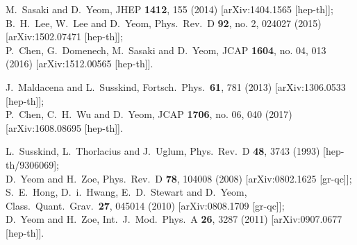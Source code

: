\documentclass[preprintnumbers,10pt,nofootinbib]{revtex4}
\begin{document}
\begin{thebibliography}{200}
  M.~Sasaki and D.~Yeom,
  JHEP {\bf 1412}, 155 (2014)
  [arXiv:1404.1565 [hep-th]];\\
  B.~H.~Lee, W.~Lee and D.~Yeom,
  Phys.\ Rev.\ D {\bf 92}, no. 2, 024027 (2015)
  [arXiv:1502.07471 [hep-th]];\\
  P.~Chen, G.~Domenech, M.~Sasaki and D.~Yeom,
  JCAP {\bf 1604}, no. 04, 013 (2016)
  [arXiv:1512.00565 [hep-th]].

  J.~Maldacena and L.~Susskind,
  Fortsch.\ Phys.\  {\bf 61}, 781 (2013)
  [arXiv:1306.0533 [hep-th]];\\
  P.~Chen, C.~H.~Wu and D.~Yeom,
  JCAP {\bf 1706}, no. 06, 040 (2017)
  [arXiv:1608.08695 [hep-th]].

  L.~Susskind, L.~Thorlacius and J.~Uglum,
  Phys.\ Rev.\ D {\bf 48}, 3743 (1993)
  [hep-th/9306069];\\
  D.~Yeom and H.~Zoe,
  Phys.\ Rev.\ D {\bf 78}, 104008 (2008)
  [arXiv:0802.1625 [gr-qc]];\\
  S.~E.~Hong, D.~i.~Hwang, E.~D.~Stewart and D.~Yeom,
  Class.\ Quant.\ Grav.\  {\bf 27}, 045014 (2010)
  [arXiv:0808.1709 [gr-qc]];\\
  D.~Yeom and H.~Zoe,
  Int.\ J.\ Mod.\ Phys.\ A {\bf 26}, 3287 (2011)
  [arXiv:0907.0677 [hep-th]].


\end{thebibliography}
\end{document}

